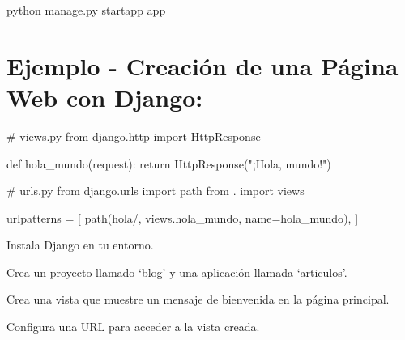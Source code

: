 \documentclass[
  a4paper,
  DIV=11,
  numbers=noendperiod,
  onepage,
  openany]{scrreprt}
\newenvironment{Shaded}{\begin{snugshade}}{\end{snugshade}}
\newcommand{\CommentTok}[1]{\textcolor[rgb]{0.37,0.37,0.37}{#1}}
\newcommand{\ControlFlowTok}[1]{\textcolor[rgb]{0.00,0.23,0.31}{#1}}
\newcommand{\ExtensionTok}[1]{\textcolor[rgb]{0.00,0.23,0.31}{#1}}
\newcommand{\ImportTok}[1]{\textcolor[rgb]{0.00,0.46,0.62}{#1}}
\newcommand{\KeywordTok}[1]{\textcolor[rgb]{0.00,0.23,0.31}{#1}}
\newcommand{\NormalTok}[1]{\textcolor[rgb]{0.00,0.23,0.31}{#1}}
\newcommand{\OperatorTok}[1]{\textcolor[rgb]{0.37,0.37,0.37}{#1}}
\newcommand{\StringTok}[1]{\textcolor[rgb]{0.13,0.47,0.30}{#1}}
\begin{document}
\begin{Shaded}
\begin{Highlighting}[]
\ExtensionTok{python}\NormalTok{ manage.py startapp app}
\end{Highlighting}
\end{Shaded}

\hypertarget{ejemplo---creaciuxf3n-de-una-puxe1gina-web-con-django-1}{%
\section{Ejemplo - Creación de una Página Web con
Django:}\label{ejemplo---creaciuxf3n-de-una-puxe1gina-web-con-django-1}}

\begin{Shaded}
\begin{Highlighting}[]
\CommentTok{\# views.py}
\ImportTok{from}\NormalTok{ django.http }\ImportTok{import}\NormalTok{ HttpResponse}

\KeywordTok{def}\NormalTok{ hola\_mundo(request):}
    \ControlFlowTok{return}\NormalTok{ HttpResponse(}\StringTok{"¡Hola, mundo!"}\NormalTok{)}
\end{Highlighting}
\end{Shaded}

\begin{Shaded}
\begin{Highlighting}[]
\CommentTok{\# urls.py}
\ImportTok{from}\NormalTok{ django.urls }\ImportTok{import}\NormalTok{ path}
\ImportTok{from}\NormalTok{ . }\ImportTok{import}\NormalTok{ views}

\NormalTok{urlpatterns }\OperatorTok{=}\NormalTok{ [}
\NormalTok{    path(}\StringTok{\textquotesingle{}hola/\textquotesingle{}}\NormalTok{, views.hola\_mundo, name}\OperatorTok{=}\StringTok{\textquotesingle{}hola\_mundo\textquotesingle{}}\NormalTok{),}
\NormalTok{]}
\end{Highlighting}
\end{Shaded}

\begin{tcolorbox}[enhanced jigsaw, colbacktitle=quarto-callout-important-color!10!white, toprule=.15mm, leftrule=.75mm, titlerule=0mm, opacityback=0, rightrule=.15mm, opacitybacktitle=0.6, breakable, left=2mm, coltitle=black, title=\textcolor{quarto-callout-important-color}{\faExclamation}\hspace{0.5em}{Actividad Práctica:}, toptitle=1mm, bottomtitle=1mm, arc=.35mm, bottomrule=.15mm, colback=white, colframe=quarto-callout-important-color-frame]

Instala Django en tu entorno.

Crea un proyecto llamado `blog' y una aplicación llamada `articulos'.

Crea una vista que muestre un mensaje de bienvenida en la página
principal.

Configura una URL para acceder a la vista creada.

\end{tcolorbox}
\end{document}
